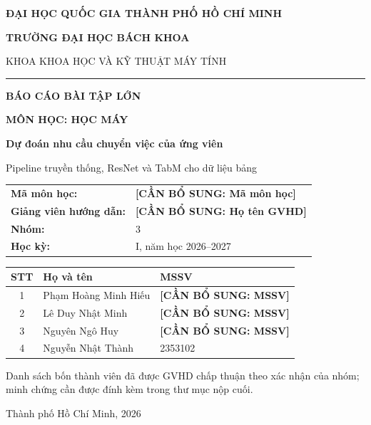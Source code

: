 \documentclass[12pt,a4paper,oneside]{report}
\newcommand{\placeholder}[1]{%
  \colorbox{placeholderbg}{\textcolor{placeholderred}{\textbf{[CẦN BỔ SUNG: #1]}}}%
}
\newcommand{\projectname}{Dự đoán nhu cầu chuyển việc của ứng viên}
\begin{document}
\begin{titlepage}
  \begin{center}
    {\large\bfseries ĐẠI HỌC QUỐC GIA THÀNH PHỐ HỒ CHÍ MINH}\par
    \vspace{0.25cm}
    {\large\bfseries TRƯỜNG ĐẠI HỌC BÁCH KHOA}\par
    \vspace{0.2cm}
    {\large KHOA KHOA HỌC VÀ KỸ THUẬT MÁY TÍNH}\par

    \vspace{0.7cm}
    {\color{hcmutblue}\rule{0.82\textwidth}{1.4pt}}\par
    \vspace{1.0cm}

    {\Large\bfseries BÁO CÁO BÀI TẬP LỚN}\par
    \vspace{0.3cm}
    {\LARGE\bfseries MÔN HỌC: HỌC MÁY}\par
    \vspace{0.8cm}
    {\Huge\bfseries\color{darkblue} \projectname}\par
    \vspace{0.35cm}
    {\Large Pipeline truyền thống, ResNet và TabM cho dữ liệu bảng}\par

    \vspace{1.1cm}
    \begin{tabular}{>{\bfseries}l l}
      Mã môn học: & \placeholder{Mã môn học} \\
      Giảng viên hướng dẫn: & \placeholder{Họ tên GVHD} \\
      Nhóm: & 3 \\
      Học kỳ: & I, năm học 2026--2027 \\
    \end{tabular}

    \vfill
    \begin{tabularx}{0.95\textwidth}{c X l}
      \toprule
      \textbf{STT} & \textbf{Họ và tên} & \textbf{MSSV} \\
      \midrule
      1 & Phạm Hoàng Minh Hiếu & \placeholder{MSSV} \\
      2 & Lê Duy Nhật Minh & \placeholder{MSSV} \\
      3 & Nguyên Ngô Huy & \placeholder{MSSV} \\
      4 & Nguyễn Nhật Thành & 2353102 \\
      \bottomrule
    \end{tabularx}

    \vspace{0.35cm}
    {\small Danh sách bốn thành viên đã được GVHD chấp thuận theo xác nhận của nhóm; minh chứng cần được đính kèm trong thư mục nộp cuối.}

    \vfill
    {\large Thành phố Hồ Chí Minh, 2026}
  \end{center}
\end{titlepage}
\end{document}
